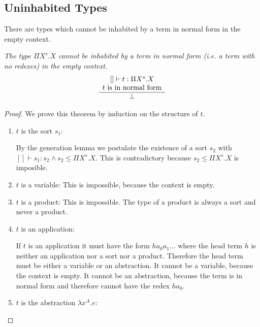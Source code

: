 \subsection{Uninhabited Types}



There are types which cannot be inhabited by a term in normal form in the empty
context.

\begin{theorem}
    \emph{The type $\Pi X^s. X$ cannot be inhabited by a term in normal form
    (i.e. a term with no redexes) in the empty context.}
    $$
    \begin{array}{c} 
        [] \vdash t: \Pi X^s. X
        \\
        t \text{ is in normal form}
     \\ \hline 
        \perp
    \end{array}
    $$

    \begin{proof}
        We prove this theorem by induction on the structure of $t$.
        \begin{enumerate}
        \item $t$ is the sort $s_1$:

            By the generation lemma we postulate the existence of a sort $s_2$
                with $[] \vdash s_1: s_2 \land s_2 \le \Pi X^s. X$. This is
                contradictory because $s_2 \le \Pi X^s.X$ is imposible.

        \item $t$ is a variable:
            This is impossible, because the context is empty.

        \item $t$ is a product:
            This is impossible. The type of a product is always a sort and never
                a product.

        \item $t$ is an application:

            If $t$ is an application it must have the form $h a_0 a_1 \ldots$
                where the head term $h$ is neither an application nor a sort nor
                a product. Therefore the head term must be either a variable or
                an abstraction. It cannot be a variable, because the context is
                empty. It cannot be an abstraction, because the term is in
                normal form and therefore cannot have the redex $h a_0$.

        \item $t$ is the abstraction $\lambda x^A. e$:


\end{enumerate}
\end{proof}
\end{theorem}

